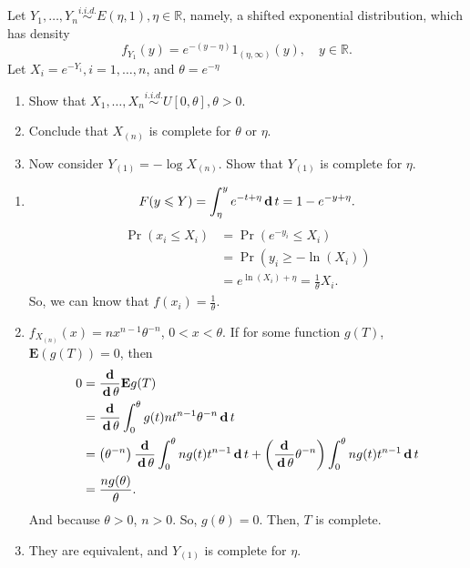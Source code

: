 \begin{exercise}
    Let \(Y_{1}, \ldots, Y_{n} \stackrel{i.i.d. }{\sim} E(\eta, 1), \eta \in \mathbb{R}\), namely, a shifted exponential distribution, which has density
    \[
    f_{Y_{1}}(y)=e^{-(y-\eta)} 1_{(\eta, \infty)}(y), \quad y \in \mathbb{R} .
    \]
    Let \(X_{i}=e^{-Y_{i}}, i=1, \ldots, n\), and \(\theta=e^{-\eta}\)
    \begin{enumerate}
        \item Show that \(X_{1}, \ldots, X_{n} \stackrel{i.i.d. }{\sim} U[0, \theta], \theta>0\). 
        \item Conclude that \(X_{(n)}\) is complete for \(\theta\) or \(\eta\). 
        \item Now consider \(Y_{(1)}=-\log X_{(n)}\). Show that \(Y_{(1)}\) is complete for \(\eta\). 
    \end{enumerate}
\end{exercise}

\begin{solution}
    \begin{enumerate}
        \item \[
            F(y\leqslant Y)=\int_\eta^ye^{-t+\eta}\,\mathbf{d}\, t= 1-e^{-y+\eta}. 
        \]
        \[
            \begin{aligned}
                \Pr(x_i\leqslant X_i)&=\Pr(e^{-y_i}\leqslant X_i)\\
                &=\Pr(y_i\geqslant -\ln(X_i))\\
                &=e^{\ln(X_i)+\eta}=\frac{1}{\theta}X_i. 
            \end{aligned}
        \]
        So, we can know that \(f(x_i)=\frac{1}{\theta}\). 
        \item $f_{X_{(n)}}(x)=nx^{n-1}\theta^{-n}$, $0<x<\theta$. If for some function $g(T)$, $\mathbf{E}(g(T))=0$, then 
        \[
            \begin{aligned}
                0 &=\frac{\,\mathbf{d}\,}{\,\mathbf{d}\,  \theta} \mathbf{E} g(T) \\
                &=\frac{\,\mathbf{d}\,}{\,\mathbf{d}\,  \theta} \int_{0}^{\theta} g(t) n t^{n-1} \theta^{-n} \,\mathbf{d}\,  t \\
                &=\left(\theta^{-n}\right) \frac{\,\mathbf{d}\,}{\,\mathbf{d}\,  \theta} \int_{0}^{\theta} n g(t) t^{n-1} \,\mathbf{d}\,  t+\left(\frac{\,\mathbf{d}\,}{\,\mathbf{d}\,  \theta} \theta^{-n}\right) \int_{0}^{\theta} n g(t) t^{n-1} \,\mathbf{d}\,  t\\
                &=\frac{ng(\theta)}{\theta}. 
            \end{aligned}
        \]
        And because $\theta>0$, $n>0$. So, $g(\theta)=0$. Then, $T$ is complete. 
        \item They are equivalent, and $Y_{(1)}$ is complete for $\eta$. 
    \end{enumerate}
\end{solution}

